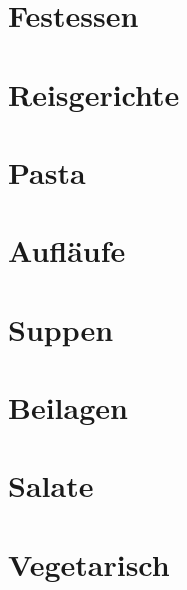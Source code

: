 \documentclass[11pt, DIV=15, twoside=false]{scrbook}
\begin{document}
\newcommand\x{1} %

\tableofcontents

\part{Festessen}






\part{Reisgerichte}




\part{Pasta}





\part{Aufläufe}





\part{Suppen}



\part{Beilagen}


\part{Salate}


\part{Vegetarisch}



\end{document}
